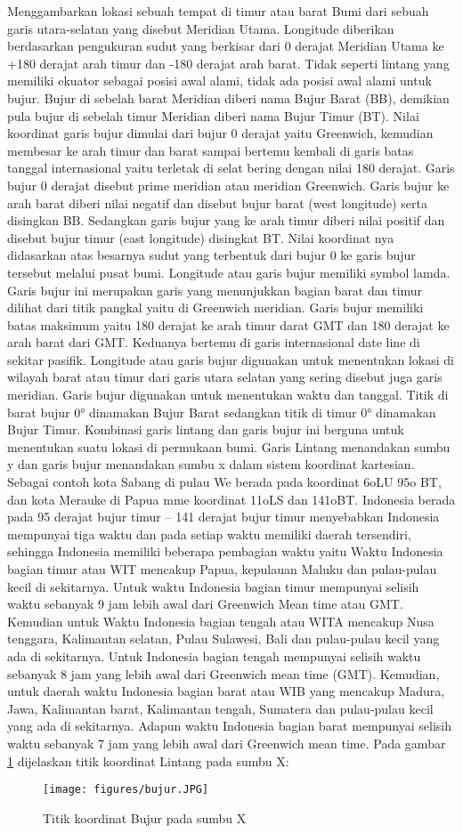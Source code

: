 Menggambarkan lokasi sebuah tempat di timur atau barat Bumi dari sebuah garis utara-selatan yang disebut Meridian Utama. Longitude diberikan berdasarkan pengukuran sudut yang berkisar dari 0 derajat Meridian Utama ke +180 derajat arah timur dan -180 derajat arah barat. Tidak seperti lintang yang memiliki ekuator sebagai posisi awal alami, tidak ada posisi awal alami untuk bujur. Bujur di sebelah barat Meridian diberi nama Bujur Barat (BB), demikian pula bujur di sebelah timur Meridian diberi nama Bujur Timur (BT).
Nilai koordinat garis bujur dimulai dari bujur 0 derajat yaitu Greenwich, kemudian membesar ke arah timur dan barat sampai bertemu kembali di garis batas tanggal internasional yaitu terletak di selat bering dengan nilai 180 derajat. Garis bujur 0 derajat disebut prime meridian atau meridian Greenwich. Garis bujur ke arah barat diberi nilai negatif dan disebut bujur barat (west longitude) serta disingkan BB. Sedangkan garis bujur yang ke arah timur diberi nilai positif dan disebut bujur timur (east longitude) disingkat BT. Nilai koordinat nya didasarkan atas besarnya sudut yang terbentuk dari bujur 0 ke garis bujur tersebut melalui pusat bumi.
Longitude atau garis bujur memiliki symbol lamda. Garis bujur ini merupakan garis yang menunjukkan bagian barat dan timur dilihat dari titik pangkal yaitu di Greenwich meridian. Garis bujur memiliki batas maksimum yaitu 180 derajat ke arah timur darat GMT dan 180 derajat ke arah barat dari GMT. Keduanya bertemu di garis internasional date line di sekitar pasifik.
Longitude atau garis bujur digunakan untuk menentukan lokasi di wilayah barat atau timur dari garis utara selatan yang sering disebut juga garis meridian. Garis bujur digunakan untuk menentukan waktu dan tanggal.
Titik di barat bujur 0° dinamakan Bujur Barat sedangkan titik di timur 0° dinamakan Bujur Timur. Kombinasi garis lintang dan garis bujur ini berguna untuk menentukan suatu lokasi di permukaan bumi. Garis Lintang menandakan sumbu y dan garis bujur menandakan sumbu x dalam sistem koordinat kartesian. Sebagai contoh kota Sabang di pulau We berada pada koordinat 6oLU 95o BT, dan kota Merauke di Papua mme koordinat 11oLS dan 141oBT.
Indonesia berada pada 95 derajat bujur timur – 141 derajat bujur timur menyebabkan Indonesia mempunyai tiga waktu dan pada setiap waktu memiliki daerah tersendiri, sehingga Indonesia memiliki beberapa pembagian waktu yaitu Waktu Indonesia bagian timur atau WIT mencakup Papua, kepulauan Maluku dan pulau-pulau kecil di sekitarnya. Untuk waktu Indonesia bagian timur mempunyai selisih waktu sebanyak 9 jam lebih awal dari Greenwich Mean time atau GMT. Kemudian untuk Waktu Indonesia bagian tengah atau WITA mencakup Nusa tenggara, Kalimantan selatan, Pulau Sulawesi, Bali dan pulau-pulau kecil yang ada di sekitarnya. Untuk Indonesia bagian tengah mempunyai selisih waktu sebanyak 8 jam yang lebih awal dari Greenwich mean time (GMT). Kemudian, untuk daerah waktu Indonesia bagian barat atau WIB yang mencakup Madura, Jawa, Kalimantan barat, Kalimantan tengah, Sumatera dan pulau-pulau kecil yang ada di sekitarnya. Adapun waktu Indonesia bagian barat mempunyai selisih waktu sebanyak 7 jam yang lebih awal dari Greenwich mean time.
Pada gambar \ref{bujur} dijelaskan titik koordinat Lintang pada sumbu X:
\begin{figure}[ht]
	\centerline{\texttt{[image: figures/bujur.JPG]}}
	\caption{Titik koordinat Bujur pada sumbu X}

	\label{bujur}
	\end{figure}
